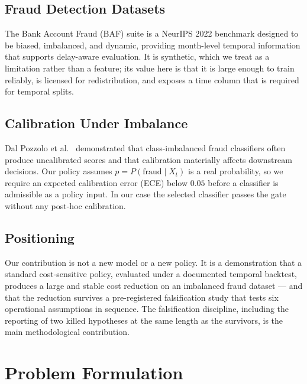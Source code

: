 \documentclass[conference]{IEEEtran}
\begin{document}
\subsection{Fraud Detection Datasets}

The Bank Account Fraud (BAF) suite \cite{jesus2022} is a NeurIPS 2022
benchmark designed to be biased, imbalanced, and dynamic, providing
month-level temporal information that supports delay-aware evaluation. It is
synthetic, which we treat as a limitation rather than a feature; its value
here is that it is large enough to train reliably, is licensed for
redistribution, and exposes a time column that is required for temporal
splits.

\subsection{Calibration Under Imbalance}

Dal Pozzolo et al.\ \cite{dalpozzolo2015} demonstrated that
class-imbalanced fraud classifiers often produce uncalibrated scores and
that calibration materially affects downstream decisions. Our policy
assumes $p = P(\text{fraud} \mid X_t)$ is a real probability, so we require
an expected calibration error (ECE) below $0.05$ before a classifier is
admissible as a policy input. In our case the selected classifier passes the
gate without any post-hoc calibration.

\subsection{Positioning}

Our contribution is not a new model or a new policy. It is a demonstration
that a standard cost-sensitive policy, evaluated under a documented temporal
backtest, produces a large and stable cost reduction on an imbalanced fraud
dataset --- and that the reduction survives a pre-registered falsification
study that tests six operational assumptions in sequence. The falsification
discipline, including the reporting of two killed hypotheses at the same
length as the survivors, is the main methodological contribution.

\section{Problem Formulation}
\label{sec:problem}
\end{document}
